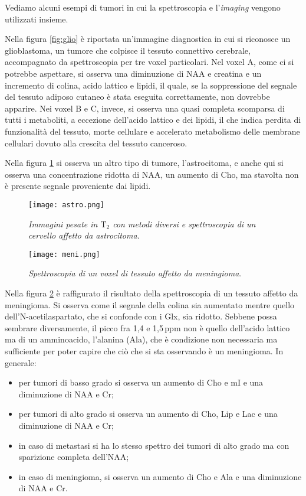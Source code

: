 \documentclass{report}
\newcommand{\figref}[1]{figura \ref{#1}}
\numberwithin{equation}{section}
\numberwithin{figure}{section}
\begin{document}
\noindent Vediamo alcuni esempi di tumori in cui la spettroscopia e l'\textit{imaging} vengono utilizzati insieme.

Nella \figref{fig:glio} è riportata un'immagine diagnostica in cui si riconosce un glioblastoma, un tumore che colpisce il tessuto connettivo cerebrale, accompagnato da spettroscopia per tre voxel particolari. Nel voxel A, come ci si potrebbe aspettare, si osserva una diminuzione di NAA e creatina e un incremento di colina, acido lattico e lipidi, il quale, se la soppressione del segnale del tessuto adiposo cutaneo è stata eseguita correttamente, non dovrebbe apparire. Nei voxel B e C, invece, si osserva una quasi completa scomparsa di tutti i metaboliti, a eccezione dell'acido lattico e dei lipidi, il che indica perdita di funzionalità del tessuto, morte cellulare e accelerato metabolismo delle membrane cellulari dovuto alla crescita del tessuto canceroso.

Nella \figref{fig:astro} si osserva un altro tipo di tumore, l'astrocitoma, e anche qui si osserva una concentrazione ridotta di NAA, un aumento di Cho, ma stavolta non è presente segnale proveniente dai lipidi.

\begin{figure}[htp]
\centering
\texttt{[image: astro.png]}
\caption{\label{fig:astro} \textit{Immagini pesate in $\mathrm{T_2}$ con metodi diversi e spettroscopia di un cervello affetto da astrocitoma}.}
\end{figure}

\begin{figure}[htp]
\centering
\texttt{[image: meni.png]}
\caption{\label{fig:meni} \textit{Spettroscopia di un voxel di tessuto affetto da meningioma}.}
\end{figure}

Nella \figref{fig:meni} è raffigurato il risultato della spettroscopia di un tessuto affetto da meningioma. Si osserva come il segnale della colina sia aumentato mentre quello dell'N-acetilaspartato, che si confonde con i Glx, sia ridotto. Sebbene possa sembrare diversamente, il picco fra 1,4 e 1,5\,ppm non è quello dell'acido lattico ma di un amminoacido, l'alanina (Ala), che è condizione non necessaria ma sufficiente per poter capire che ciò che si sta osservando è un meningioma. In generale:
\begin{itemize}[label=$-$]
    \item per tumori di basso grado si osserva un aumento di Cho e mI e una diminuzione di NAA e Cr;
    \item per tumori di alto grado si osserva un aumento di Cho, Lip e Lac e una diminuzione di NAA e Cr;
    \item in caso di metastasi si ha lo stesso spettro dei tumori di alto grado ma con sparizione completa dell'NAA;
    \item in caso di meningioma, si osserva un aumento di Cho e Ala e una diminuzione di NAA e Cr.
\end{itemize}
\end{document}
